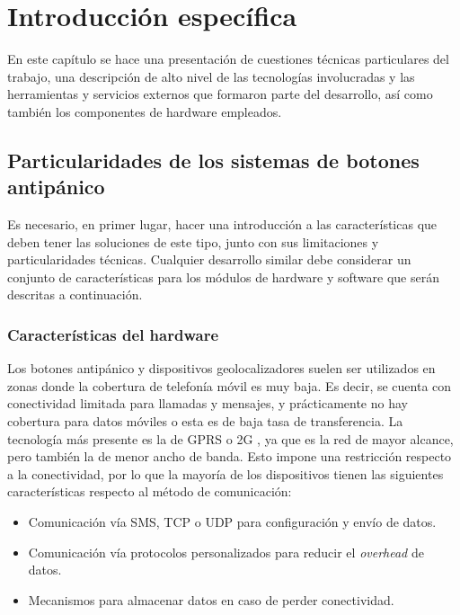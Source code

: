 \chapter{Introducción específica} %

\label{Chapter2}
En este capítulo se hace una presentación de cuestiones técnicas particulares del trabajo, una descripción de alto nivel de las tecnologías involucradas y las herramientas y servicios externos que formaron parte del desarrollo, así como también los componentes de hardware empleados.

\section{Particularidades de los sistemas de botones antipánico}

Es necesario, en primer lugar, hacer una introducción a las características que deben tener las soluciones de este tipo, junto con sus limitaciones y particularidades técnicas. Cualquier desarrollo similar debe considerar un conjunto de características para los módulos de hardware y software que serán descritas a continuación.

\subsection{Características del hardware}

Los botones antipánico y dispositivos geolocalizadores suelen ser utilizados en zonas donde la cobertura de telefonía móvil es muy baja. Es decir, se cuenta con conectividad limitada para llamadas y mensajes, y prácticamente no hay cobertura para datos móviles o esta es de baja tasa de transferencia. La tecnología más presente es la de GPRS o 2G \citep{NPERF:1}, ya que es la red de mayor alcance, pero también la de menor ancho de banda.
Esto impone una restricción respecto a la conectividad, por lo que la mayoría de los dispositivos tienen las siguientes características respecto al método de comunicación:
\begin{itemize}
	\item Comunicación vía SMS, TCP o UDP para configuración y envío de datos.
	\item Comunicación vía protocolos personalizados \citep{PROTOCOLS:1} para reducir el \textit{overhead} de datos.
	\item Mecanismos para almacenar datos en caso de perder conectividad.
\end{itemize}

